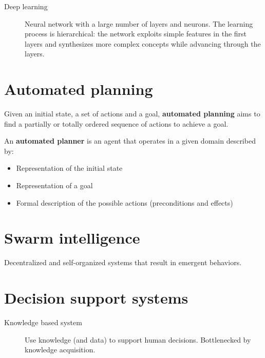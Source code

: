 \begin{description}
    \item[Deep learning] 
        Neural network with a large number of layers and neurons.
        The learning process is hierarchical: the network exploits simple features in the first layers and
        synthesizes more complex concepts while advancing through the layers.
\end{description}



\section{Automated planning}
Given an initial state, a set of actions and a goal, 
\textbf{automated planning} aims to find a partially or totally ordered sequence of actions to achieve a goal. 

An \textbf{automated planner} is an agent that operates in a given domain described by:
\begin{itemize}
    \item Representation of the initial state
    \item Representation of a goal
    \item Formal description of the possible actions (preconditions and effects)
\end{itemize}



\section{Swarm intelligence}
Decentralized and self-organized systems that result in emergent behaviors. 



\section{Decision support systems}

\begin{description}
    \item[Knowledge based system] 
        Use knowledge (and data) to support human decisions.
        Bottlenecked by knowledge acquisition.
\end{description}

